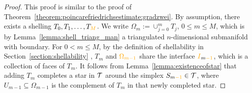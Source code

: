 \documentclass[10pt,letterpaper]{article}
\newcommand\cye[1]{%
  \protect\leavevmode
  \begingroup
    \color{red!35!yellow}%
    #1%
  \endgroup
}
\begin{document}
\begin{proof}
    This proof is similar to the proof of Theorem~\ref{theorem:poincarefriedrichsestimate:gradzwei}.
    By assumption, there exists a shelling $T_0, T_1, \dots, T_{\cye{M}}$. 
    We write $\Omega_m := \cup_{j=0}^{m} T_j$, \cye{$0 \leq m \leq M$,} which is \cye{by Lemma~\ref{lemma:shell_triang_man}} a triangulated $n$-dimensional submanifold with boundary. 
    For $0 < m \leq M$, by \cye{the definition of shellability in Section~\ref{section:shellability}}, $T_{m}$ and $\cye{\Omega_{m-1}}$ share the interface $\cye{I}_{m\cye{-1}}$, which is a collection of faces of $T_{m}$. 
    \cye{It follows from} Lemma~\ref{lemma:existenceofstar} \cye{that} adding $T_{m}$ completes a star in ${\mathcal T}$ around the simplex $S_{m\cye{-1}} \in \calT$, \cye{where} $U_{m-1} \subseteq \Omega_{m-1}$ is the complement of $T_{m}$ in that newly completed star.
    

\end{proof}
\end{document}
